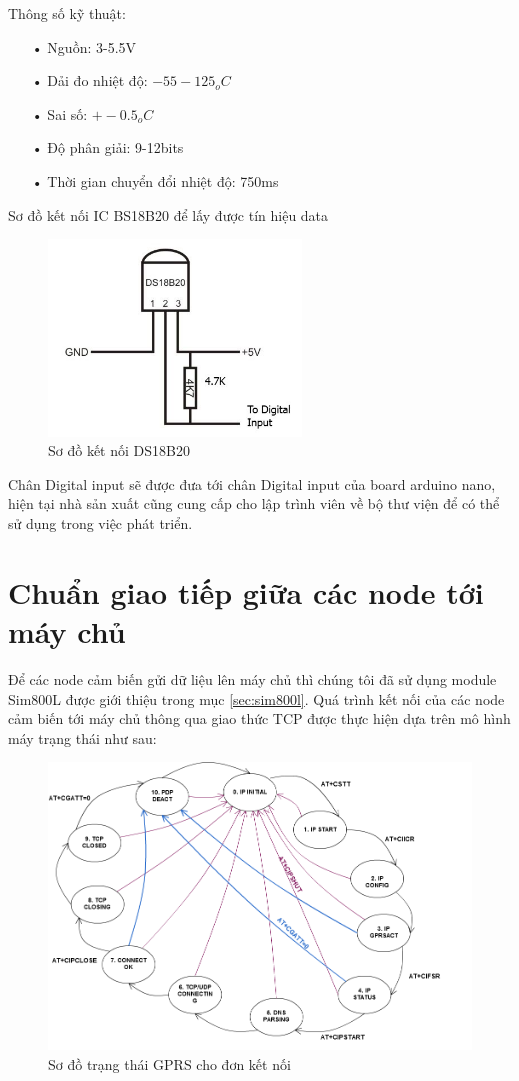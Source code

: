 Thông số kỹ thuật:
\begin{itemize}
\item[•]Nguồn: 3-5.5V
\item[•]Dải đo nhiệt độ: $-55 -125_{o}C$
\item[•]Sai số: $+-0.5_{o}C$
\item[•]Độ phân giải: 9-12bits
\item[•]Thời gian chuyển đổi nhiệt độ: 750ms
\end{itemize}
Sơ đồ kết nối IC BS18B20 để lấy được tín hiệu data
\begin{figure}[H]
	\centering    
	\includegraphics[width=0.6\textwidth]{ds18b20_ketnoi}
	\caption[Sơ đồ kết nối DS18B20]{Sơ đồ kết nối DS18B20}
	\label{fig: ds18b20_ketnoi}
\end{figure}
Chân Digital input sẽ được đưa tới chân Digital input của board arduino nano, hiện tại nhà sản xuất cũng cung cấp cho lập trình viên về bộ thư viện để có thể sử dụng trong việc phát triển.


\section{Chuẩn giao tiếp giữa các node tới máy chủ}
Để các node cảm biến gửi dữ liệu lên máy chủ thì chúng tôi đã sử dụng module Sim800L được giới thiệu trong mục \ref{sec:sim800l}. Quá trình kết nối của các node cảm biến tới máy chủ thông qua giao thức TCP được thực hiện dựa trên mô hình máy trạng thái như sau:


\begin{figure}[H]
\centering   
\includegraphics[width=1\textwidth]{sim800_status}
\caption[Sơ đồ trạng thái GPRS cho đơn kết nối]{Sơ đồ trạng thái GPRS cho đơn kết nối}
\label{fig:sim800_status}
\end{figure}

